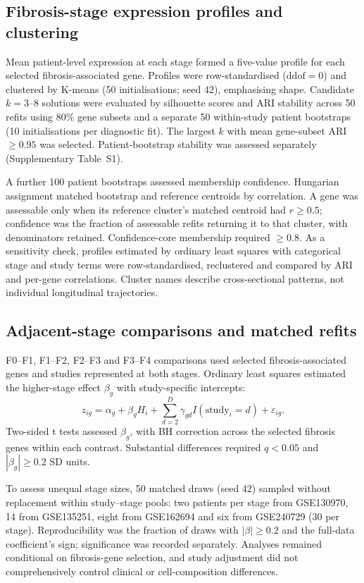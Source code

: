 \documentclass[11pt,a4paper]{article}
\begin{document}
\subsection*{Fibrosis-stage expression profiles and clustering}
Mean patient-level expression at each stage formed a five-value profile for each selected fibrosis-associated gene. Profiles were row-standardised ($\mathrm{ddof}=0$) and clustered by K-means (50 initialisations; seed 42), emphasising shape. Candidate $k=3$--8 solutions were evaluated by silhouette scores and ARI stability across 50 refits using 80\% gene subsets and a separate 50 within-study patient bootstraps (10 initialisations per diagnostic fit). The largest $k$ with mean gene-subset ARI $\geq0.95$ was selected. Patient-bootstrap stability was assessed separately (Supplementary Table~S1).

A further 100 patient bootstraps assessed membership confidence. Hungarian assignment matched bootstrap and reference centroids by correlation. A gene was assessable only when its reference cluster's matched centroid had $r\geq0.5$; confidence was the fraction of assessable refits returning it to that cluster, with denominators retained. Confidence-core membership required $\geq0.8$. As a sensitivity check, profiles estimated by ordinary least squares with categorical stage and study terms were row-standardised, reclustered and compared by ARI and per-gene correlations. Cluster names describe cross-sectional patterns, not individual longitudinal trajectories.

\subsection*{Adjacent-stage comparisons and matched refits}
F0--F1, F1--F2, F2--F3 and F3--F4 comparisons used selected fibrosis-associated genes and studies represented at both stages. Ordinary least squares estimated the higher-stage effect $\beta_g$ with study-specific intercepts:
\[
z_{ig}=\alpha_g+\beta_g H_i+\sum_{d=2}^{D}\gamma_{gd}I(\mathrm{study}_i=d)+\varepsilon_{ig}.
\]
Two-sided t tests assessed $\beta_g$, with BH correction across the selected fibrosis genes within each contrast. Substantial differences required $q<0.05$ and $|\beta_g|\geq0.2$ SD units.

To assess unequal stage sizes, 50 matched draws (seed 42) sampled without replacement within study--stage pools: two patients per stage from GSE130970, 14 from GSE135251, eight from GSE162694 and six from GSE240729 (30 per stage). Reproducibility was the fraction of draws with $|\beta|\geq0.2$ and the full-data coefficient's sign; significance was recorded separately. Analyses remained conditional on fibrosis-gene selection, and study adjustment did not comprehensively control clinical or cell-composition differences.
\end{document}
